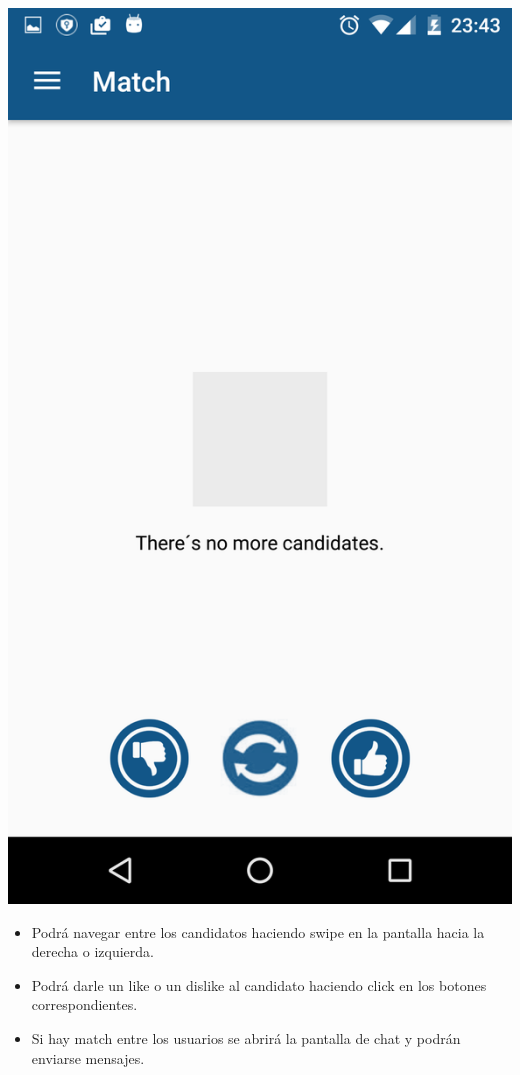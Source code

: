 \documentclass[letterpaper,10pt,english]{sphinxmanual}
\begin{document}
\includegraphics{match.png}
\begin{itemize}
\item {} 
Podrá navegar entre los candidatos haciendo swipe en la pantalla hacia la derecha o izquierda.

\item {} 
Podrá darle un like o un dislike al candidato haciendo click en los botones correspondientes.

\item {} 
Si hay match entre los usuarios se abrirá la pantalla de chat y podrán enviarse mensajes.

\end{itemize}
\end{document}
